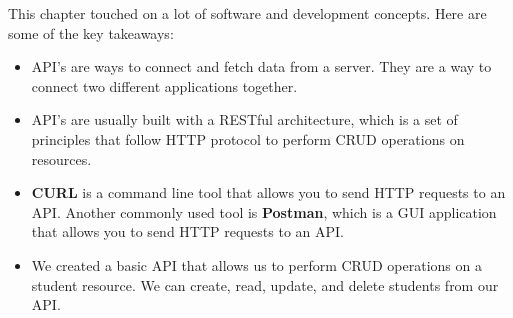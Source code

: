 This chapter touched on a lot of software and development concepts. Here are some of the key takeaways:
\begin{itemize}
  \item API's are ways to connect and fetch data from a server. They are a way to connect two different applications together.
  \item API's are usually built with a RESTful architecture, which is a set of principles that follow HTTP protocol to perform CRUD operations on resources.
  \item \textbf{CURL} is a command line tool that allows you to send HTTP requests to an API. Another commonly used tool is \textbf{Postman}, which is a GUI application that allows you to send HTTP requests to an API.
  \item We created a basic API that allows us to perform CRUD operations on a student resource. We can create, read, update, and delete students from our API.
\end{itemize}